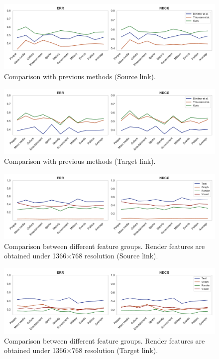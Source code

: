 \begin{figure}[t]
\centering
\includegraphics[width=1\textwidth,height=3.5cm]{exp_tab1_src}
\caption{Comparison with previous methods (Source link).}
\label{table_cmp1}
\end{figure}

\begin{figure}[t]
\centering
\includegraphics[width=1\textwidth,height=3.5cm]{exp_tab1_tgt}
\caption{Comparison with previous methods (Target link).}
\label{table_cmp2}
\end{figure}

\begin{figure}[t]
\centering
\includegraphics[width=1\textwidth,height=3.5cm]{exp_tab2_src}
\caption{Comparison between different feature groups. Render features are obtained under 1366$\times$768 resolution (Source link).}
\label{table_cmp3}
\end{figure}

\begin{figure}[t]
\centering
\includegraphics[width=1\textwidth,height=3.5cm]{exp_tab2_tgt}
\caption{Comparison between different feature groups. Render features are obtained under 1366$\times$768 resolution (Target link).}
\label{table_cmp4}
\end{figure}

